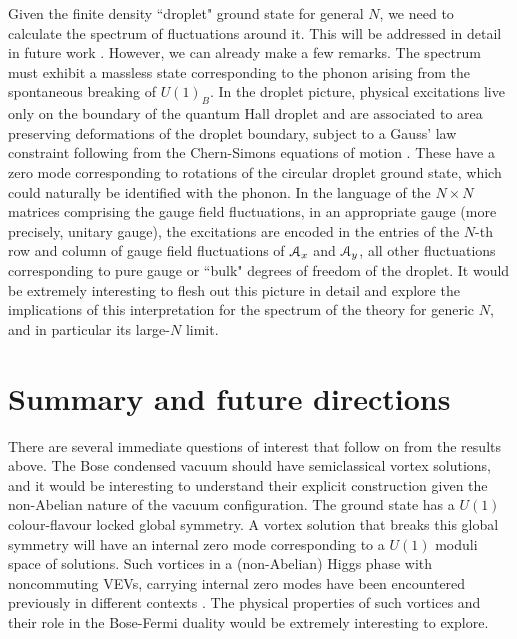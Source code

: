 Given the finite density ``droplet" ground state for general $N$, we need to calculate the spectrum of fluctuations around it. This will be addressed in detail in future work  \cite{ongoing}. However, we can already make a few remarks.  The spectrum must exhibit a massless state corresponding to the phonon arising from the spontaneous breaking of $U(1)_B$. In the droplet picture,  physical excitations live only on the boundary of the quantum Hall droplet and are associated to area preserving deformations of the droplet boundary, subject to a Gauss' law constraint following from the Chern-Simons equations of motion \cite{hep-th/0103013}.  These have a zero mode corresponding to rotations of the circular droplet ground state, which could naturally be identified with the phonon.  In the language of the $N\times N$ matrices comprising the gauge field fluctuations, in an appropriate gauge (more precisely, unitary gauge), the excitations are encoded in the entries of the $N$-th row and column of gauge field fluctuations of ${\cal A}_x$ and ${\cal A}_y$, all other fluctuations corresponding to pure gauge or ``bulk" degrees of freedom  of the droplet. 
It would be extremely interesting to flesh out this picture in detail and explore the implications of this interpretation for the spectrum of the theory for generic $N$, and in particular its large-$N$ limit.
\section{Summary and future directions}
\label{sec5}
There are several immediate questions of interest that follow on from the results above.
The Bose condensed vacuum should have semiclassical vortex solutions, and it would be interesting to understand their explicit construction given the non-Abelian nature of the vacuum configuration. The ground state has a $U(1)$ colour-flavour locked global symmetry. A vortex solution that breaks this global symmetry will have an internal zero mode corresponding to a $U(1)$ moduli space of solutions.  Such vortices in a (non-Abelian) Higgs phase with noncommuting VEVs, carrying internal zero modes have been encountered previously in different contexts \cite{Markov:2004mj, Auzzi:2008ep, 0906.2366}. The physical properties of such vortices and their role in the Bose-Fermi duality would be extremely interesting to explore.

